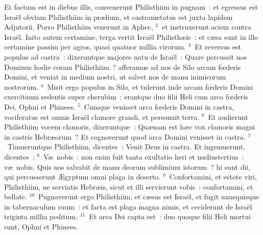 \lettrine[lines=10,image=true,loversize=0.05,lraise=-0.03]{E}{}t factum est in diebus illis, convenerunt Philisthiim in pugnam~: et egressus est Isra\"el obviam Philisthiim in pr\ae lium, et castrametatus est juxta lapidem Adjutorii. Porro Philisthiim venerunt in Aphec,
${}^{2}$~et instruxerunt aciem contra Isra\"el. Inito autem certamine, terga vertit Isra\"el Philisth\ae is~: et c\ae sa sunt in illo certamine passim per agros, quasi quatuor millia virorum.
${}^{3}$~Et reversus est populus ad castra~: dixeruntque majores natu de Isra\"el~: Quare percussit nos Dominus hodie coram Philisthiim~? afferamus ad nos de Silo arcam fœderis Domini, et veniat in medium nostri, ut salvet nos de manu inimicorum nostrorum.
${}^{4}$~Misit ergo populus in Silo, et tulerunt inde arcam fœderis Domini exercituum sedentis super cherubim~: erantque duo filii Heli cum arca fœderis Dei, Ophni et Phinees.
${}^{5}$~Cumque venisset arca fœderis Domini in castra, vociferatus est omnis Isra\"el clamore grandi, et personuit terra.
${}^{6}$~Et audierunt Philisthiim vocem clamoris, dixeruntque~: Qu\ae nam est h\ae c vox clamoris magni in castris Hebr\ae orum~? Et cognoverunt quod arca Domini venisset in castra.
${}^{7}$~Timueruntque Philisthiim, dicentes~: Venit Deus in castra. Et ingemuerunt, dicentes~:
${}^{8}$~V\ae\ nobis~: non enim fuit tanta exultatio heri et nudiustertius~: v\ae\ nobis. Quis nos salvabit de manu deorum sublimium istorum~? hi sunt dii, qui percusserunt \AE gyptum omni plaga in deserto.
${}^{9}$~Confortamini, et estote viri, Philisthiim, ne serviatis Hebr\ae is, sicut et illi servierunt vobis~: confortamini, et bellate.
${}^{10}$~Pugnaverunt ergo Philisthiim, et c\ae sus est Isra\"el, et fugit unusquisque in tabernaculum suum~: et facta est plaga magna nimis, et ceciderunt de Isra\"el triginta millia peditum.
${}^{11}$~Et arca Dei capta est~: duo quoque filii Heli mortui sunt, Ophni et Phinees.


